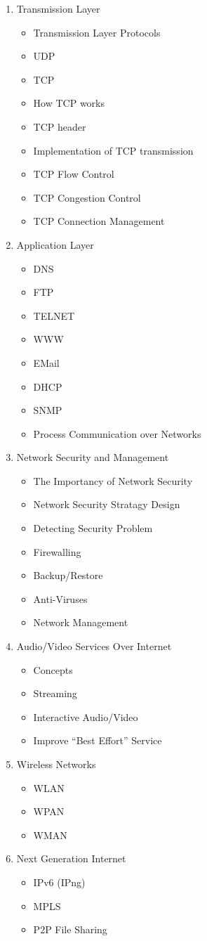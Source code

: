 \documentclass{wx672article}
\begin{document}
\begin{enumerate}
\begin{itemize}
\end{itemize}
\item Transmission Layer
\begin{itemize}
\item Transmission Layer Protocols
\item UDP
\item TCP
\item How TCP works
\item TCP header
\item Implementation of TCP transmission
\item TCP Flow Control
\item TCP Congestion Control
\item TCP Connection Management
\end{itemize}
\item Application Layer
\begin{itemize}
\item DNS
\item FTP
\item TELNET
\item WWW
\item EMail
\item DHCP
\item SNMP
\item Process Communication over Networks
\end{itemize}
\item Network Security and Management
\begin{itemize}
\item The Importancy of Network Security
\item Network Security Stratagy Design
\item Detecting Security Problem
\item Firewalling
\item Backup/Restore
\item Anti-Viruses
\item Network Management
\end{itemize}
\item Audio/Video Services Over Internet
\begin{itemize}
\item Concepts
\item Streaming
\item Interactive Audio/Video
\item Improve ``Best Effort'' Service
\end{itemize}
\item Wireless Networks
\begin{itemize}
\item WLAN
\item WPAN
\item WMAN
\end{itemize}
\item Next Generation Internet
\begin{itemize}
\item IPv6 (IPng)
\item MPLS
\item P2P File Sharing
\end{itemize}
\end{enumerate}
\end{document}
